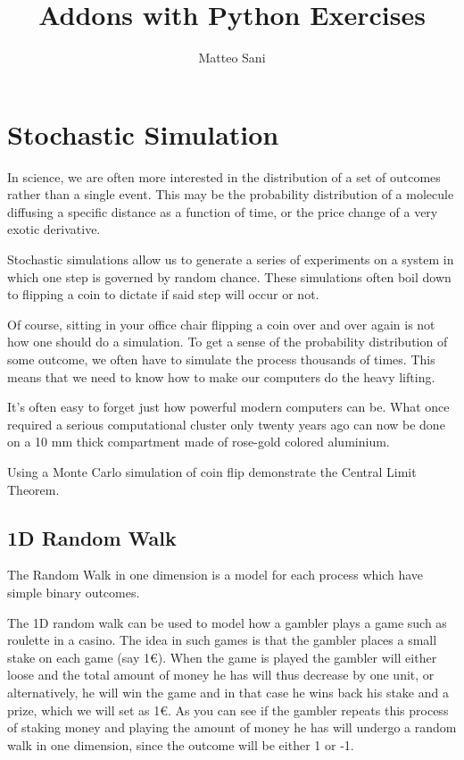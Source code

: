 \documentclass[12pt,a4paper]{article}
\title{Addons with Python Exercises}
\author{Matteo Sani}
\begin{document}
\maketitle

\section{Stochastic Simulation}
In science, we are often more interested in the distribution of a set of outcomes rather than a single event. This may be the probability distribution of a molecule diffusing a specific distance as a function of time, or the price change of a very exotic derivative.

Stochastic simulations allow us to generate a series of experiments on a system in which one step is governed by random chance. These simulations often boil down to flipping a coin to dictate if said step will occur or not.

Of course, sitting in your office chair flipping a coin over and over again is not how one should do a simulation. To get a sense of the probability distribution of some outcome, we often have to simulate the process thousands of times. This means that we need to know how to make our computers do the heavy lifting.

It's often easy to forget just how powerful modern computers can be. What once required a serious computational cluster only twenty years ago can now be done on a 10 mm thick compartment made of rose-gold colored aluminium. 


\begin{question}
Using a Monte Carlo simulation of coin flip demonstrate the Central Limit Theorem.
\end{question}

\subsection{1D Random Walk}
The Random Walk in one dimension is a model for each process which have simple binary outcomes.

The 1D random walk can be used to model how a gambler plays a game such as roulette in a casino. The idea in such games is that the gambler places a small stake on each game (say 1€). When the game is played the gambler will either loose and the total amount of money he has will thus decrease by one unit, or alternatively, he will win the game and in that case he wins back his stake and a prize, which we will set as 1€. As you can see if the gambler repeats this process of staking money and playing the amount of money he has will undergo a random walk in one dimension, since the outcome will be either 1 or -1.
\end{document}
